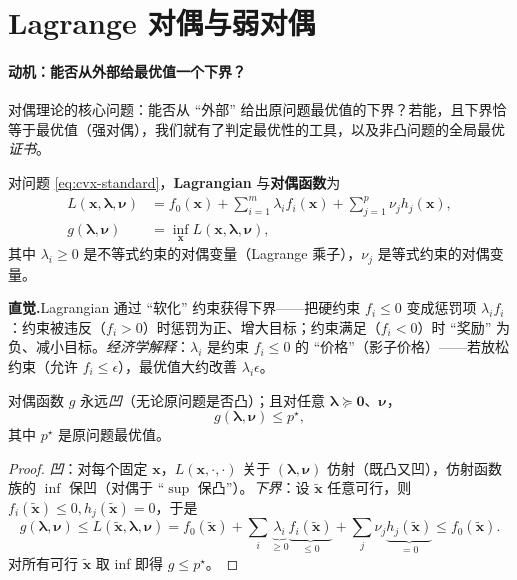 \section{Lagrange 对偶与弱对偶}
\label{sec:cvx-duality}

\paragraph{动机：能否从外部给最优值一个下界？}
对偶理论的核心问题：能否从 “外部” 给出原问题最优值的下界？若能，且下界恰等于最优值（强对偶），我们就有了判定最优性的工具，以及非凸问题的全局最优\emph{证书}。

\begin{definition}\label{def:lagrangian}
对问题 \cref{eq:cvx-standard}，\textbf{Lagrangian} 与\textbf{对偶函数}为
\begin{align}
  L(\mathbf x,\boldsymbol\lambda,\boldsymbol\nu)&=f_0(\mathbf x)+\sum_{i=1}^m\lambda_i f_i(\mathbf x)+\sum_{j=1}^p\nu_j h_j(\mathbf x),\label{eq:lagrangian}\\
  g(\boldsymbol\lambda,\boldsymbol\nu)&=\inf_{\mathbf x}L(\mathbf x,\boldsymbol\lambda,\boldsymbol\nu),\label{eq:dual-function}
\end{align}
其中 $\lambda_i\ge0$ 是不等式约束的对偶变量（Lagrange 乘子），$\nu_j$ 是等式约束的对偶变量。
\end{definition}

\noindent\textbf{直觉.}\;Lagrangian 通过 “软化” 约束获得下界——把硬约束 $f_i\le0$ 变成惩罚项 $\lambda_i f_i$：约束被违反（$f_i>0$）时惩罚为正、增大目标；约束满足（$f_i<0$）时 “奖励” 为负、减小目标。\emph{经济学解释}：$\lambda_i$ 是约束 $f_i\le0$ 的 “价格”（影子价格）——若放松约束（允许 $f_i\le\epsilon$），最优值大约改善 $\lambda_i\epsilon$。

\begin{theorem}[弱对偶]\label{thm:weak-duality}
对偶函数 $g$ 永远\emph{凹}（无论原问题是否凸）；且对任意 $\boldsymbol\lambda\succeq\mathbf 0$、$\boldsymbol\nu$，
\begin{equation}
  g(\boldsymbol\lambda,\boldsymbol\nu)\le p^\star,
  \label{eq:weak-duality}
\end{equation}
其中 $p^\star$ 是原问题最优值。
\end{theorem}
\begin{proof}
\emph{凹}：对每个固定 $\mathbf x$，$L(\mathbf x,\cdot,\cdot)$ 关于 $(\boldsymbol\lambda,\boldsymbol\nu)$ 仿射（既凸又凹），仿射函数族的 $\inf$ 保凹（对偶于 “$\sup$ 保凸”）。\emph{下界}：设 $\tilde{\mathbf x}$ 任意可行，则 $f_i(\tilde{\mathbf x})\le0,h_j(\tilde{\mathbf x})=0$，于是
\[
  g(\boldsymbol\lambda,\boldsymbol\nu)\le L(\tilde{\mathbf x},\boldsymbol\lambda,\boldsymbol\nu)=f_0(\tilde{\mathbf x})+\sum_i\underbrace{\lambda_i}_{\ge0}\underbrace{f_i(\tilde{\mathbf x})}_{\le0}+\sum_j\nu_j\underbrace{h_j(\tilde{\mathbf x})}_{=0}\le f_0(\tilde{\mathbf x}).
\]
对所有可行 $\tilde{\mathbf x}$ 取 inf 即得 $g\le p^\star$。
\end{proof}

